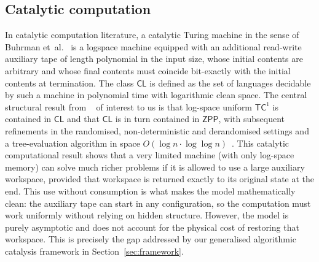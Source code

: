 \documentclass[runningheads]{llncs}
\newcommand{\CL}{\mathsf{CL}}
\newcommand{\ZPP}{\mathsf{ZPP}}
\newcommand{\TCone}{\mathsf{TC}^1}
\begin{document}
\subsection{Catalytic computation}
In catalytic computation literature, a catalytic Turing machine in the sense of Buhrman et~al.~\cite{buhrman2014computing}
is a logspace machine equipped with an additional read-write
auxiliary tape of length polynomial in the input size, whose initial
contents are arbitrary and whose final contents must coincide
bit-exactly with the initial contents at termination. The class $\CL$
is defined as the set of languages decidable by such a machine in
polynomial time with logarithmic clean space. The central
structural result from ~\cite{buhrman2014computing,koucky2016catalytic} of interest to us is that log-space uniform $\TCone$ is contained in
$\CL$ and that $\CL$ is in turn contained in
$\ZPP$, with
subsequent refinements in the randomised, non-deterministic and
derandomised settings \cite{buhrman2018catalytic,girard2013catalytic,pyne2023catalytic}
and a tree-evaluation algorithm in space
$O(\log n\cdot\log\log n)$~\cite{cook2024tree,cook2025lower,goldreich2024lower}. 
This catalytic computational result shows that a very limited machine (with only log-space memory) can solve much richer problems if it is allowed to use a large auxiliary workspace, provided that workspace is returned exactly to its original state at the end. This use without consumption is what makes the model mathematically clean: the auxiliary tape can start in any configuration, so the computation must work uniformly without relying on hidden structure. However, the model is purely asymptotic and does not account for the physical cost of restoring that workspace. This is precisely the gap addressed by our generalised algorithmic catalysis framework in Section~\ref{sec:framework}.
\end{document}
